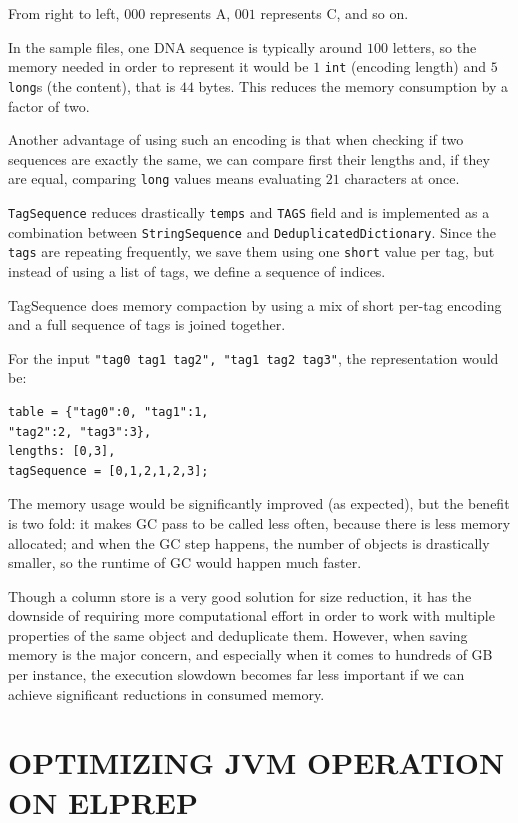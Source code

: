 \documentclass[a4paper,twoside]{article}
\begin{document}
From right to left, $000$ represents A, $001$ represents C, and so on.

In the sample files, one DNA sequence is typically around $100$ letters, so the memory needed in order to represent it would be $1$ {\texttt{int}} (encoding length) and $5$ {\texttt{long}}s (the content), that is $44$ bytes.
This reduces the memory consumption by a factor of two.

Another advantage of using such an encoding is that when checking if two sequences are exactly the same, we can compare first their lengths and, if they are equal, comparing {\texttt{long}} values means evaluating $21$ characters at once.

{\texttt{TagSequence}} reduces drastically {\texttt{temps}} and {\texttt{TAGS}}  field and is implemented as a combination between {\texttt{StringSequence}} and {\texttt{DeduplicatedDictionary}}.
Since the {\texttt{tags}} are repeating frequently, we save them using one {\texttt{short}} value per tag, but instead of using a list of tags, we define a sequence of indices.

TagSequence does memory compaction by using a mix of short per-tag encoding and a full sequence of tags is joined together.

For the input {\texttt{"tag0 tag1 tag2", "tag1 tag2 tag3"}}, the representation would be:
\begin{verbatim}
table = {"tag0":0, "tag1":1, 
"tag2":2, "tag3":3},
lengths: [0,3], 
tagSequence = [0,1,2,1,2,3]; 
\end{verbatim}

The memory usage would be significantly improved (as expected), but the benefit is two fold: it makes GC pass to be called less often, because there is less memory allocated; and when the GC step happens, the number of objects is drastically smaller, so the runtime of GC would happen much faster.

Though a column store is a very good solution for size reduction, it has the downside of requiring more computational effort in order to work with multiple properties of the same object and deduplicate them.
However, when saving memory is the major concern, and especially when it comes to hundreds of GB per instance, the execution slowdown becomes far less important if we can achieve significant reductions in consumed memory.


\section{\uppercase{Optimizing JVM Operation on ElPrep}}
\label{sec:io}
\end{document}
